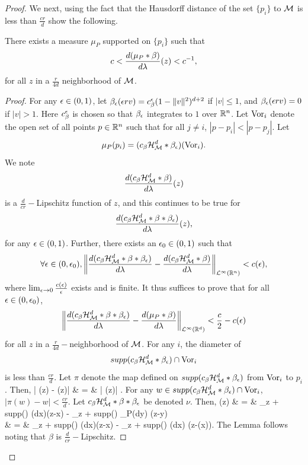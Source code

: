 \documentclass[final, 12pt]{colt2018} %
\begin{document}
\begin{proof}
We next, using the fact that the Hausdorff distance of the set $\{p_i\}$ to $\mathcal M$ is less than $\frac{cr}{d}$  show the following. 

\begin{lemma} There exists a measure $\mu_P$ supported on $\{p_i\}$ such that 
$$c  < \frac{d(\mu_P * \beta)}{d\lambda}(z) < c^{-1},$$ for all $z$ in a $\frac{r}{4d}$ neighborhood of $\mathcal M$.
\end{lemma}
\begin{proof}
For any ${\epsilon} \in (0,1)$, let $\beta_{\epsilon}({\epsilon} rv) =  c^{\epsilon}_\beta(1 - \|v\|^2)^{d+2}$ if $|v| \leq 1$, and $\beta_{\epsilon}({\epsilon} rv) = 0$ if $|v| > 1$. Here $c^{\epsilon}_\beta$ is chosen so that $\beta_{\epsilon}$ integrates to $1$ over $\mathbb R^n$.
Let $\hbox{Vor}_i$ denote the open set of all points $p \in \mathbb R^n$ such that for all $j \neq i$, $|p - p_i| < |p - p_j|.$
Let $$\mu_P(p_i) = (c_\beta \mathcal{H}_{\mathcal M}^d* \beta_{\epsilon})(\hbox{Vor}_i).$$
We note 
 $$\frac{d(c_\beta \mathcal{H}_\mathcal M^d * \beta)}{d\lambda}(z) $$ is a $\frac{d}{cr}-$Lipschitz function of $z$, and this continues to be true for 
$$\frac{d(c_\beta \mathcal{H}_\mathcal M^d* \beta*\beta_{\epsilon})}{d\lambda}(z),$$ for any ${\epsilon} \in (0, 1)$. Further, there exists an ${\epsilon}_0 \in (0, 1)$ such that 
$$\forall {\epsilon} \in (0, {\epsilon}_0), \left\|\frac{d(c_\beta \mathcal{H}_\mathcal M^d * \beta*\beta_{\epsilon})}{d\lambda} - \frac{d(c_\beta \mathcal{H}_\mathcal M^d * \beta)}{d\lambda}\right\|_{\mathcal{L}^\infty(\mathbb R^n)} < c({\epsilon}),$$ where $\lim_{{\epsilon} \rightarrow 0} \frac{c({\epsilon})}{{\epsilon}}$ exists and is finite.
It thus suffices to prove that for all ${\epsilon} \in (0, {\epsilon}_0)$, 
$$ \left\|\frac{d(c_\beta \mathcal{H}_\mathcal M^d *\beta*\beta_{\epsilon})}{d\lambda} - \frac{d(\mu_P * \beta)}{d\lambda} \right\|_{\mathcal{L}^\infty(\mathbb R^d)} < \frac{c}{2} - c({\epsilon})$$ for all $z$ in a $\frac{r}{4d}-$neighborhood of $\mathcal M$. 
For any $i$, the diameter of $$supp(c_\beta \mathcal{H}_\mathcal M^d *\beta_{\epsilon})\cap \hbox{Vor}_i$$ is less than $\frac{cr}{d}$. Let $\pi$ denote the map defined on $supp(c_\beta \mathcal{H}_\mathcal M^d *\beta_{\epsilon})$ from $\hbox{Vor}_i$ to $p_i$.
Then, \beqs \left| (z) - (z)\right| & = & 
\left| (z)\right| .\eeqs
                  For any $w \in supp(c_\beta \mathcal{H}_\mathcal M^d *\beta_{\epsilon})\cap \hbox{Vor}_i$, $|\pi(w) - w| < \frac{cr}{d}$. 
Let $c_\beta\mathcal{H}_\mathcal M^d *\beta*\beta_{\epsilon}$ be denoted $\nu$.
Then, 
\beqs  {}(z)
& = & \int_{z + supp(\beta)} \nu(dx)\beta(z-x) - \int_{z + supp(\beta)} \mu_P(dy) \beta(z-y)\\
& = & \int_{z + supp(\beta)} \nu(dx)\beta(z-x) - \int_{z + supp(\beta)} \nu(dx) \beta(z-\pi(x)).
\eeqs
The Lemma follows noting that $\beta$ is $\frac{d}{cr}-$Lipschitz.


\end{proof}
\end{proof}
\end{document}
